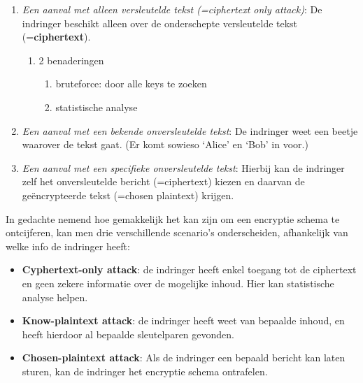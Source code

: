 \begin{enumerate}

\item \textit{Een aanval met alleen versleutelde tekst (=ciphertext only attack)}: De indringer beschikt alleen over de onderschepte versleutelde tekst (=\textbf{ciphertext}).
    \begin{enumerate}
\item 2 benaderingen
        \begin{enumerate}
\item bruteforce: door alle keys te zoeken
\item statistische analyse
        \end{enumerate}

    \end{enumerate}
\item \textit{Een aanval met een bekende onversleutelde tekst}: De indringer weet een beetje waarover de tekst gaat. (Er komt sowieso ‘Alice’ en ‘Bob’ in voor.)
\item \textit{Een aanval met een specifieke onversleutelde tekst}: Hierbij kan de indringer zelf het onversleutelde bericht (=ciphertext) kiezen en daarvan de geëncrypteerde tekst (=chosen plaintext) krijgen.
\end{enumerate}
In gedachte nemend hoe gemakkelijk het kan zijn om een encryptie schema te ontcijferen, kan men drie verschillende scenario’s onderscheiden, afhankelijk van welke info de indringer heeft:
\begin{itemize}
    \item \textbf{Cyphertext-only attack}: de indringer heeft enkel toegang tot de ciphertext en geen zekere informatie over de mogelijke inhoud. Hier kan statistische analyse helpen.
    \item \textbf{Know-plaintext attack}: de indringer heeft weet van bepaalde inhoud, en heeft hierdoor al bepaalde sleutelparen gevonden.
    \item \textbf{Chosen-plaintext attack}: Als de indringer een bepaald bericht kan laten sturen, kan de indringer het encryptie schema ontrafelen.
\end{itemize}


